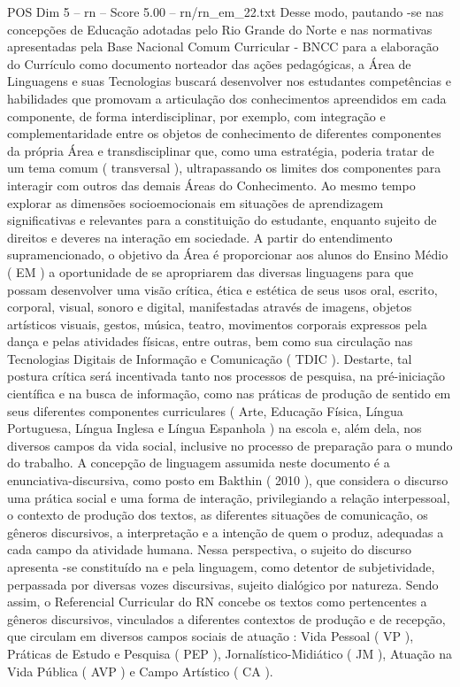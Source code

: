 \begin{textsample}{POS Dim 5 – rn – Score 5.00 – rn/rn\_em\_22.txt}
Desse modo, pautando -se nas concepções de Educação adotadas pelo Rio Grande do Norte e nas normativas apresentadas pela Base Nacional Comum Curricular - BNCC para a elaboração do Currículo como documento norteador das ações pedagógicas, a Área de Linguagens e suas Tecnologias buscará desenvolver nos estudantes competências e habilidades que promovam a articulação dos conhecimentos apreendidos em cada componente, de forma interdisciplinar, por exemplo, com integração e complementaridade entre os objetos de conhecimento de diferentes componentes da própria Área e transdisciplinar que, como uma estratégia, poderia tratar de um tema comum ( transversal ), ultrapassando os limites dos componentes para interagir com outros das demais Áreas do Conhecimento.
Ao mesmo tempo explorar as dimensões socioemocionais em situações de aprendizagem significativas e relevantes para a constituição do estudante, enquanto sujeito de direitos e deveres na interação em sociedade.
A partir do entendimento supramencionado, o objetivo da Área é proporcionar aos alunos do Ensino Médio ( EM ) a oportunidade de se apropriarem das diversas linguagens para que possam desenvolver uma visão crítica, ética e estética de seus usos oral, escrito, corporal, visual, sonoro e digital, manifestadas através de imagens, objetos artísticos visuais, gestos, música, teatro, movimentos corporais expressos pela dança e pelas atividades físicas, entre outras, bem como sua circulação nas Tecnologias Digitais de Informação e Comunicação ( TDIC ).
Destarte, tal postura crítica será incentivada tanto nos processos de pesquisa, na pré-iniciação científica e na busca de informação, como nas práticas de produção de sentido em seus diferentes componentes curriculares ( Arte, Educação Física, Língua Portuguesa, Língua Inglesa e Língua Espanhola ) na escola e, além dela, nos diversos campos da vida social, inclusive no processo de preparação para o mundo do trabalho.
A concepção de linguagem assumida neste documento é a enunciativa-discursiva, como posto em Bakthin ( 2010 ), que considera o discurso uma prática social e uma forma de interação, privilegiando a relação interpessoal, o contexto de produção dos textos, as diferentes situações de comunicação, os gêneros discursivos, a interpretação e a intenção de quem o produz, adequadas a cada campo da atividade humana.
Nessa perspectiva, o sujeito do discurso apresenta -se constituído na e pela linguagem, como detentor de subjetividade, perpassada por diversas vozes discursivas, sujeito dialógico por natureza.
Sendo assim, o Referencial Curricular do RN concebe os textos como pertencentes a gêneros discursivos, vinculados a diferentes contextos de produção e de recepção, que circulam em diversos campos sociais de atuação : Vida Pessoal ( VP ), Práticas de Estudo e Pesquisa ( PEP ), Jornalístico-Midiático ( JM ), Atuação na Vida Pública ( AVP ) e Campo Artístico ( CA ).

\end{textsample}
